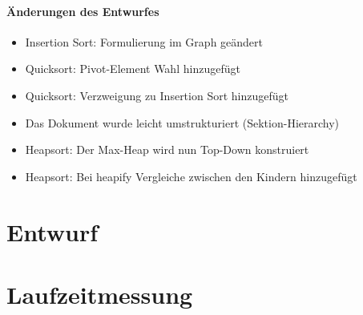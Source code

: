 \documentclass[11pt]{article}
\begin{document}
    \paragraph*{Änderungen des Entwurfes}
    \begin{itemize}
        \setlength\itemsep{0em}
        \item Insertion Sort: Formulierung im Graph geändert
        \item Quicksort: Pivot-Element Wahl hinzugefügt
        \item Quicksort: Verzweigung zu Insertion Sort hinzugefügt
        \item Das Dokument wurde leicht umstrukturiert (Sektion-Hierarchy)
        \item Heapsort: Der Max-Heap wird nun Top-Down konstruiert
        \item Heapsort: Bei heapify Vergleiche zwischen den Kindern hinzugefügt
    \end{itemize}


    \section{Entwurf}\label{sec:entwurf}
    

    \newpage

    \section{Laufzeitmessung}\label{sec:laufzeitmessung}
    
\end{document}
